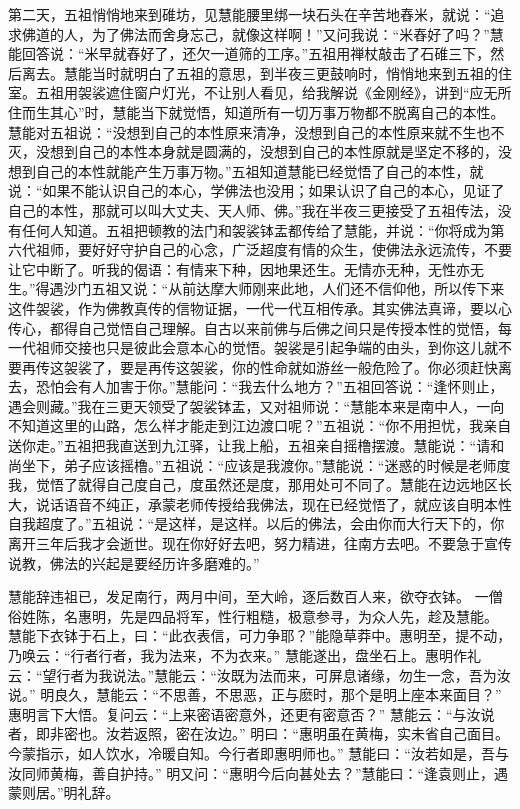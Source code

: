\documentclass[12pt,twoside,openany]{book}
\newcommand{\kai}[1]{{\CJKfamily{kai}#1}}
\begin{document}
\kai{第二天，五祖悄悄地来到碓坊，见慧能腰里绑一块石头在辛苦地舂米，就说：“追求佛道的人，为了佛法而舍身忘己，就像这样啊！”又问我说：“米舂好了吗？”慧能回答说：“米早就舂好了，还欠一道筛的工序。”五祖用禅杖敲击了石碓三下，然后离去。慧能当时就明白了五祖的意思，到半夜三更鼓响时，悄悄地来到五祖的住室。五祖用袈裟遮住窗户灯光，不让别人看见，给我解说《金刚经》，讲到“应无所住而生其心”时，慧能当下就觉悟，知道所有一切万事万物都不脱离自己的本性。慧能对五祖说：“没想到自己的本性原来清净，没想到自己的本性原来就不生也不灭，没想到自己的本性本身就是圆满的，没想到自己的本性原就是坚定不移的，没想到自己的本性就能产生万事万物。”五祖知道慧能已经觉悟了自己的本性，就说：“如果不能认识自己的本心，学佛法也没用；如果认识了自己的本心，见证了自己的本性，那就可以叫大丈夫、天人师、佛。”我在半夜三更接受了五祖传法，没有任何人知道。五祖把顿教的法门和袈裟钵盂都传给了慧能，并说：“你将成为第六代祖师，要好好守护自己的心念，广泛超度有情的众生，使佛法永远流传，不要让它中断了。听我的偈语：有情来下种，因地果还生。无情亦无种，无性亦无生。”得遇沙门五祖又说：“从前达摩大师刚来此地，人们还不信仰他，所以传下来这件袈裟，作为佛教真传的信物证据，一代一代互相传承。其实佛法真谛，要以心传心，都得自己觉悟自己理解。自古以来前佛与后佛之间只是传授本性的觉悟，每一代祖师交接也只是彼此会意本心的觉悟。袈裟是引起争端的由头，到你这儿就不要再传这袈裟了，要是再传这袈裟，你的性命就如游丝一般危险了。你必须赶快离去，恐怕会有人加害于你。”慧能问：“我去什么地方？”五祖回答说：“逢怀则止，遇会则藏。”我在三更天领受了袈裟钵盂，又对祖师说：“慧能本来是南中人，一向不知道这里的山路，怎么样才能走到江边渡口呢？”五祖说：“你不用担忧，我亲自送你走。”五祖把我直送到九江驿，让我上船，五祖亲自摇橹摆渡。慧能说：“请和尚坐下，弟子应该摇橹。”五祖说：“应该是我渡你。”慧能说：“迷惑的时候是老师度我，觉悟了就得自己度自己，度虽然还是度，那用处可不同了。慧能在边远地区长大，说话语音不纯正，承蒙老师传授给我佛法，现在已经觉悟了，就应该自明本性自我超度了。”五祖说：“是这样，是这样。以后的佛法，会由你而大行天下的，你离开三年后我才会逝世。现在你好好去吧，努力精进，往南方去吧。不要急于宣传说教，佛法的兴起是要经历许多磨难的。”}

慧能辞违祖已，发足南行，两月中间，至大岭，逐后数百人来，欲夺衣钵。
一僧俗姓陈，名惠明，先是四品将军，性行粗糙，极意参寻，为众人先，趁及慧能。
慧能下衣钵于石上，曰：“此衣表信，可力争耶？”能隐草莽中。惠明至，提不动，乃唤云：“行者行者，我为法来，不为衣来。”
慧能遂出，盘坐石上。惠明作礼云：“望行者为我说法。”慧能云：“汝既为法而来，可屏息诸缘，勿生一念，吾为汝说。”
明良久，慧能云：“不思善，不思恶，正与麽时，那个是明上座本来面目？”
惠明言下大悟。复问云：“上来密语密意外，还更有密意否？”
慧能云：“与汝说者，即非密也。汝若返照，密在汝边。”
明曰：“惠明虽在黄梅，实未省自己面目。今蒙指示，如人饮水，冷暖自知。今行者即惠明师也。”
慧能曰：“汝若如是，吾与汝同师黄梅，善自护持。”
明又问：“惠明今后向甚处去？”慧能曰：“逢袁则止，遇蒙则居。”明礼辞。
\end{document}
